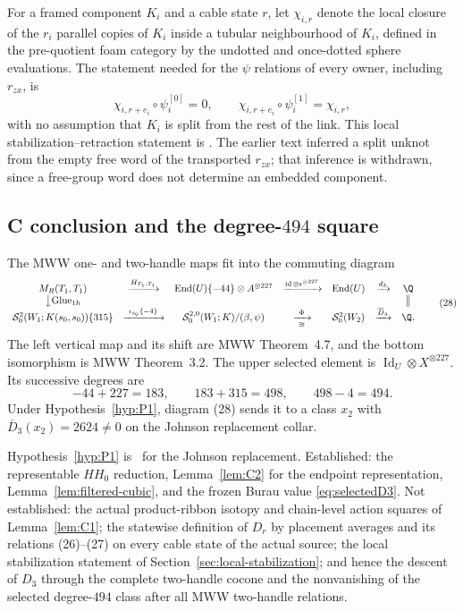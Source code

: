 For a framed component $K_i$ and a cable state $r$, let $\chi_{i,r}$ denote
the local closure of the $r_i$ parallel copies of $K_i$ inside a tubular
neighbourhood of $K_i$, defined in the pre-quotient foam category by the
undotted and once-dotted sphere evaluations.  The statement needed for the
$\psi$ relations of every owner, including $r_{zx}$, is
\[
\chi_{i,r+e_i}\circ\psi_i^{[0]}=0,\qquad
\chi_{i,r+e_i}\circ\psi_i^{[1]}=\chi_{i,r},
\]
with no assumption that $K_i$ is split from the rest of the link.  This
local stabilization--retraction statement is \Open.  The earlier text
inferred a split unknot from the empty free word of the transported
$r_{zx}$; that inference is withdrawn, since a free-group word does not
determine an embedded component.

\subsection{C conclusion and the degree-$494$ square}

The MWW one- and two-handle maps fit into the commuting diagram
\[
\begin{array}{ccccccc}
M_R(T_1,T_1)&\xrightarrow{H_{T_1,T_1}}&
\operatorname{End}(U)\{-44\}\otimes A^{\otimes227}
&\xrightarrow{\operatorname{id}\otimes\epsilon^{\otimes227}}&
\operatorname{End}(U)&\xrightarrow{d_3}&\Q\\
\big\downarrow{\mathrm{Glue}_{1h}}&&&&&&\big\Vert\\
\mathcal S^2_0(W_1;K(s_0,s_0))\{315\}
&\xrightarrow{\ \iota_{s_0}\{-4\}\ }&
\mathcal S^{2,0}_0(W_1;K)/(\beta,\psi)
&\xrightarrow[\cong]{\ \Phi\ }&\mathcal S^2_0(W_2)
&\xrightarrow{\overline D_3}&\Q.
\end{array}
\tag{28}
\]
The left vertical map and its shift are MWW Theorem~4.7, and the bottom
isomorphism is MWW Theorem~3.2.  The upper selected element is
$\operatorname{Id}_U\otimes X^{\otimes227}$.  Its successive degrees are
\[
-44+227=183,\qquad183+315=498,\qquad498-4=494.
\]
Under Hypothesis~\ref{hyp:P1}, diagram (28) sends it to a class $x_2$
with $\overline D_3(x_2)=2624\ne0$ on the Johnson replacement collar.

\begin{proposition}[Status of C]\label{thm:Cdischarge}
Hypothesis~\ref{hyp:P1} is \Open\ for the Johnson replacement.
Established: the representable $HH_0$ reduction, Lemma~\ref{lem:C2} for the
endpoint representation, Lemma~\ref{lem:filtered-cubic}, and the frozen
Burau value \eqref{eq:selectedD3}.  Not established: the actual
product-ribbon isotopy and chain-level action squares of
Lemma~\ref{lem:C1}; the statewise definition of $D_r$ by placement averages
and its relations (26)--(27) on every cable state of the actual source; the
local stabilization statement of Section~\ref{sec:local-stabilization}; and
hence the descent of $D_3$ through the complete two-handle cocone and the
nonvanishing of the selected degree-$494$ class after all MWW two-handle
relations.
\end{proposition}

